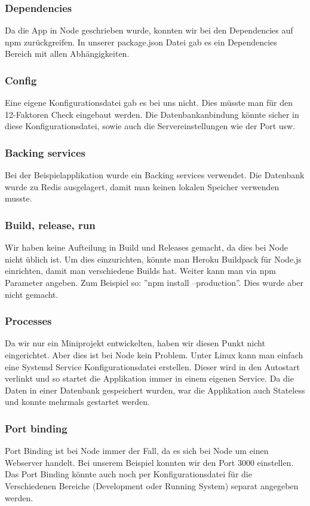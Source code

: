 \subsubsection{Dependencies}
Da die App in Node geschrieben wurde, konnten wir bei den Dependencies auf npm zurückgreifen. In unserer package.json Datei gab es ein Dependencies Bereich mit allen Abhängigkeiten.
\subsubsection{Config}
Eine eigene Konfigurationsdatei gab es bei uns nicht. Dies müsste man für den 12-Faktoren Check eingebaut werden. Die Datenbankanbindung könnte sicher in diese Konfigurationsdatei, sowie auch die Servereinstellungen wie der Port usw.
\subsubsection{Backing services}
Bei der Beispielapplikation wurde ein Backing services verwendet. Die Datenbank wurde zu Redis ausgelagert, damit man keinen lokalen Speicher verwenden musste. 
\subsubsection{Build, release, run}
Wir haben keine Aufteilung in Build und Releases gemacht, da dies bei Node nicht üblich ist. Um dies einzurichten, könnte man Heroku Buildpack für Node.js einrichten, damit man verschiedene Builds hat. Weiter kann man via npm Parameter angeben. Zum Beispiel so: ''npm install --production''. Dies wurde aber nicht gemacht.
\subsubsection{Processes}
Da wir nur ein Miniprojekt entwickelten, haben wir diesen Punkt nicht eingerichtet. Aber dies ist bei Node kein Problem. Unter Linux kann man einfach eine Systemd Service Konfigurationsdatei erstellen. Dieser wird in den Autostart verlinkt und so startet die Applikation immer in einem eigenen Service. Da die Daten in einer Datenbank gespeichert wurden, war die Applikation auch Stateless und konnte mehrmals gestartet werden.
\subsubsection{Port binding}
Port Binding ist bei Node immer der Fall, da es sich bei Node um einen Webserver handelt. Bei unserem Beispiel konnten wir den Port 3000 einstellen. Das Port Binding könnte auch noch per Konfigurationsdatei für die Verschiedenen Bereiche (Development oder Running System) separat angegeben werden.
